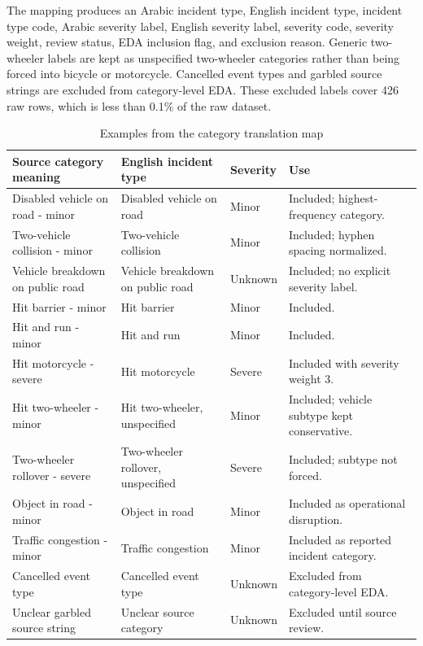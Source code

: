 The mapping produces an Arabic incident type, English incident type, incident type code, Arabic severity label, English severity label, severity code, severity weight, review status, EDA inclusion flag, and exclusion reason. Generic two-wheeler labels are kept as unspecified two-wheeler categories rather than being forced into bicycle or motorcycle. Cancelled event types and garbled source strings are excluded from category-level EDA. These excluded labels cover 426 raw rows, which is less than 0.1\% of the raw dataset.

\begin{table}[H]
\centering
\caption{Examples from the category translation map}
\label{tab:translation_examples_final}
\scriptsize
\setlength{\tabcolsep}{3pt}
\begin{tabularx}{\textwidth}{L{0.34\textwidth}L{0.30\textwidth}L{0.14\textwidth}Y}
\toprule
\textbf{Source category meaning} & \textbf{English incident type} & \textbf{Severity} & \textbf{Use} \\
\midrule
Disabled vehicle on road - minor & Disabled vehicle on road & Minor & Included; highest-frequency category. \\
Two-vehicle collision - minor & Two-vehicle collision & Minor & Included; hyphen spacing normalized. \\
Vehicle breakdown on public road & Vehicle breakdown on public road & Unknown & Included; no explicit severity label. \\
Hit barrier - minor & Hit barrier & Minor & Included. \\
Hit and run - minor & Hit and run & Minor & Included. \\
Hit motorcycle - severe & Hit motorcycle & Severe & Included with severity weight 3. \\
Hit two-wheeler - minor & Hit two-wheeler, unspecified & Minor & Included; vehicle subtype kept conservative. \\
Two-wheeler rollover - severe & Two-wheeler rollover, unspecified & Severe & Included; subtype not forced. \\
Object in road - minor & Object in road & Minor & Included as operational disruption. \\
Traffic congestion - minor & Traffic congestion & Minor & Included as reported incident category. \\
Cancelled event type & Cancelled event type & Unknown & Excluded from category-level EDA. \\
Unclear garbled source string & Unclear source category & Unknown & Excluded until source review. \\
\bottomrule
\end{tabularx}
\end{table}

